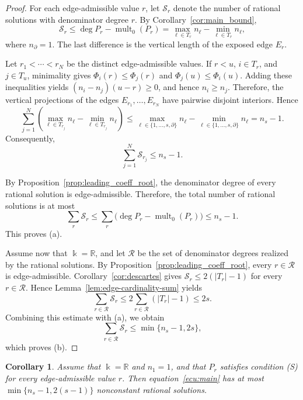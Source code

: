 \documentclass[12pt,a4paper]{amsart}
\numberwithin{theorem}{section}
\newtheorem{corollary}[theorem]{Corollary}
\theoremstyle{definition}
\begin{document}
	\begin{proof}
		For each edge-admissible value $r$, let $\mathcal S_r$ denote the number of rational solutions with denominator degree $r$. By Corollary~\ref{cor:main_bound}, 
		\[ 
		\mathcal S_r\leq\deg P_r-\operatorname{mult}_0(P_r)=\max_{\ell\in T_r}n_\ell-\min_{\ell\in T_r}n_\ell, 
		\] 
		where $n_\partial=1$. The last difference is the vertical length of the exposed edge $E_r$.
		
		Let $r_1<\cdots<r_N$ be the distinct edge-admissible values. If $r<u$, $i\in T_r$, and $j\in T_u$, minimality gives $\Phi_i(r)\leq\Phi_j(r)$ and $\Phi_j(u)\leq\Phi_i(u)$. Adding these inequalities yields $(n_i-n_j)(u-r)\geq0$, and hence $n_i\geq n_j$. Therefore, the vertical projections of the edges $E_{r_1},\ldots,E_{r_N}$ have pairwise disjoint interiors. Hence
		\[
		\sum_{j=1}^N\left(\max_{\ell\in T_{r_j}}n_\ell-\min_{\ell\in T_{r_j}}n_\ell\right)\leq\max_{\ell\in\{1,\ldots,s,\partial\}}n_\ell-\min_{\ell\in\{1,\ldots,s,\partial\}}n_\ell=n_s-1.
		\]
		Consequently,
		\[
		\sum_{j=1}^N\mathcal S_{r_j}\leq n_s-1.
		\]
		
		By Proposition~\ref{prop:leading_coeff_root}, the denominator degree of every rational solution is edge-admissible. Therefore, the total number of rational solutions is at most
		\[
		\sum_r\mathcal S_r\leq\sum_r\bigl(\deg P_r-\operatorname{mult}_0(P_r)\bigr)\leq n_s-1.
		\]
		This proves \textup{(a)}.
		
		Assume now that $\Bbbk=\mathbb{R}$, and let $\mathcal R$ be the set of denominator degrees realized by the rational solutions. By Proposition~\ref{prop:leading_coeff_root}, every $r\in\mathcal R$ is edge-admissible. Corollary~\ref{cor:descartes} gives $\mathcal S_r\leq2(|T_r|-1)$ for every $r\in\mathcal R$. Hence Lemma~\ref{lem:edge-cardinality-sum} yields
		\[
		\sum_{r\in\mathcal R}\mathcal S_r\leq2\sum_{r\in\mathcal R}(|T_r|-1)\leq2s.
		\]
		Combining this estimate with \textup{(a)}, we obtain
		\[
		\sum_{r\in\mathcal R}\mathcal S_r\leq\min\{n_s-1,2s\},
		\]
		which proves \textup{(b)}.
	\end{proof}
	
	\begin{corollary}\label{cor:linear-term-bound}
		Assume that $\Bbbk=\mathbb{R}$ and $n_1=1$, and that $P_r$ satisfies condition {\rm (S)} for every edge-admissible value $r$. Then equation~\eqref{ecu:main} has at most $\min\{n_s-1,2(s-1)\}$ nonconstant rational solutions.
	\end{corollary}
	
\end{document}
